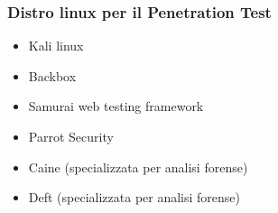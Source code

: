 \subsubsection{Distro linux per il Penetration Test}
\begin{itemize}
\item Kali linux
\item Backbox
\item Samurai web testing framework
\item Parrot Security
\item Caine (specializzata per analisi forense)
\item Deft (specializzata per analisi forense)
\end{itemize}